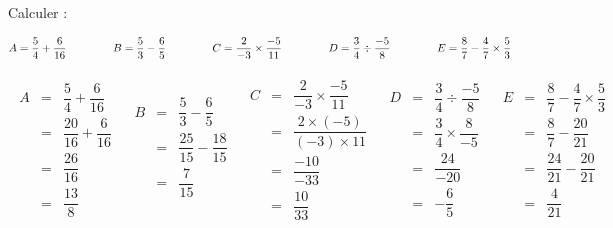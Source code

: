\begin{exo}
	Calculer :

	\[
		A = \frac{5}{4} + \frac{6}{16} \hspace{1.5cm} B = \frac{5}{3} - \frac{6}{5} \hspace{1.5cm} C = \frac{2}{-3} \times \frac{-5}{11} \hspace{1.5cm} D = \frac{3}{4} \div \frac{-5}{8} \hspace{1.5cm} E = \frac{8}{7} - \frac{4}{7} \times \frac{5}{3}
	\]

	\begin{correction}

		\[
			\begin{array}{r|r|r|r|r}
				\begin{array}{rcl}
					A & = & \dfrac{5}{4} + \dfrac{6}{16}   \\
					  & = & \dfrac{20}{16} + \dfrac{6}{16} \\
					  & = & \dfrac{26}{16}                 \\
					  & = & \dfrac{13}{8}
				\end{array}%
				 & %
				\begin{array}{rcl}
					B & = & \dfrac{5}{3} - \dfrac{6}{5}     \\
					  & = & \dfrac{25}{15} - \dfrac{18}{15} \\
					  & = & \dfrac{7}{15}                   \\
					  &   &
				\end{array} %
				 & %
				\begin{array}{rcl}
					C & = & \dfrac{2}{-3} \times \dfrac{-5}{11}   \\
					  & = & \dfrac{2 \times (-5)}{(-3) \times 11} \\
					  & = & \dfrac{-10}{-33}                      \\
					  & = & \dfrac{10}{33}
				\end{array}%
				 & %
				\begin{array}{rcl}
					D & = & \dfrac{3}{4} \div \dfrac{-5}{8}   \\
					  & = & \dfrac{3}{4} \times \dfrac{8}{-5} \\
					  & = & \dfrac{24}{-20}                   \\
					  & = & -\dfrac{6}{5}
				\end{array} %
				 & %
				\begin{array}{rcl}
					E & = & \dfrac{8}{7} - \dfrac{4}{7} \times \dfrac{5}{3} \\
					  & = & \dfrac{8}{7} - \dfrac{20}{21}                   \\
					  & = & \dfrac{24}{21} - \dfrac{20}{21}                 \\
					  & = & \dfrac{4}{21}
				\end{array}
			\end{array}
		\]

	\end{correction}
\end{exo}

